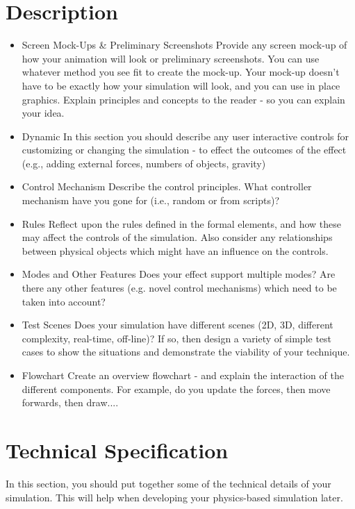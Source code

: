 \documentclass[conference,backref=page]{acmsiggraph}
\begin{document}
\section{Description}

\begin{itemize}
\item {Screen Mock-Ups \& Preliminary Screenshots}
Provide any screen mock-up of how your animation will look or preliminary screenshots.  You can use whatever method you see fit to create the mock-up.  Your mock-up doesn't have to be exactly how your simulation will look, and you can use in place graphics.  Explain principles and concepts to the reader - so you can explain your idea.
\item {Dynamic}
In this section you should describe any user interactive controls for customizing or changing the simulation - to effect the outcomes of the effect (e.g., adding external forces, numbers of objects, gravity)
\item {Control Mechanism}
Describe the control principles.  What controller mechanism have you gone for (i.e., random or from scripts)?  
\item {Rules}
Reflect upon the rules defined in the formal elements, and how these may affect the controls of the simulation.  Also consider any relationships between physical objects which might have an influence on the controls.
\item {Modes and Other Features}
Does your effect support multiple modes?  Are there any other features (e.g. novel control mechanisms) which need to be taken into account?
\item {Test Scenes}
Does your simulation have different scenes (2D, 3D, different complexity, real-time, off-line)?  If so, then design a variety of simple test cases to show the situations and demonstrate the viability of your technique.
\item {Flowchart}
Create an overview flowchart - and explain the interaction of the different components.  For example, do you update the forces, then move forwards, then draw....
\end{itemize}

\section{Technical Specification}

In this section, you should put together some of the technical details of your simulation.  This will help when developing your physics-based simulation later.
\end{document}
